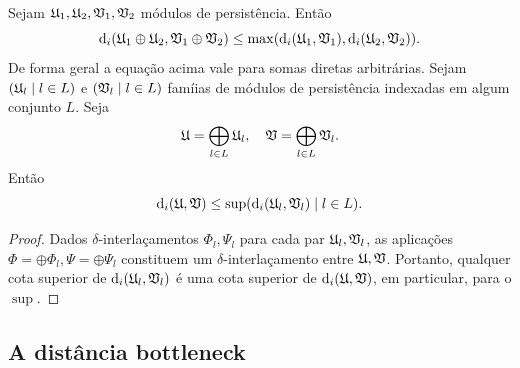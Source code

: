 \begin{propo}\label{teo:direct_sum_dist}
    Sejam $\mathfrak{U}_1, \mathfrak{U}_2, \mathfrak{V}_1, \mathfrak{V}_2$ módulos de persistência. Então
    \begin{equation*}
        \text{d}_i(\mathfrak{U}_1 \oplus \mathfrak{U}_2, \mathfrak{V}_1 \oplus \mathfrak{V}_2) \leq \max(\text{d}_i(\mathfrak{U}_1,
        \mathfrak{V}_1), \text{d}_i(\mathfrak{U}_2, \mathfrak{V}_2)).
    \end{equation*}
    De forma geral a equação acima vale para somas diretas arbitrárias. Sejam $(\mathfrak{U}_l \mid l \in L)$ 
    e $(\mathfrak{V}_l \mid l \in L)$ famíias de módulos de persistência indexadas em algum conjunto $L$. Seja
    \begin{equation*}
        \mathfrak{U} = \bigoplus_{l \in L} \mathfrak{U}_l, \quad \mathfrak{V} = \bigoplus_{l \in L} \mathfrak{V}_l.
    \end{equation*}
    Então
    \begin{equation*}
        \text{d}_i(\mathfrak{U}, \mathfrak{V}) \leq \sup(\text{d}_i(\mathfrak{U}_l, \mathfrak{V}_l) \mid l \in L).
    \end{equation*}
\end{propo}
\begin{proof}
    Dados $\delta$-interlaçamentos $\Phi_l, \Psi_l$ para cada par $\mathfrak{U}_l, \mathfrak{V}_l$, as aplicações
    $\Phi = \oplus\Phi_l, \Psi = \oplus \Psi_l$ constituem um $\delta$-interlaçamento entre 
    $\mathfrak{U}, \mathfrak{V}$. Portanto, qualquer cota superior de $\text{d}_i(\mathfrak{U}_l, \mathfrak{V}_l)$ é uma cota superior
    de $\text{d}_i(\mathfrak{U}, \mathfrak{V})$, em particular, para o $\sup$. 
\end{proof}

\subsection{A distância bottleneck}

